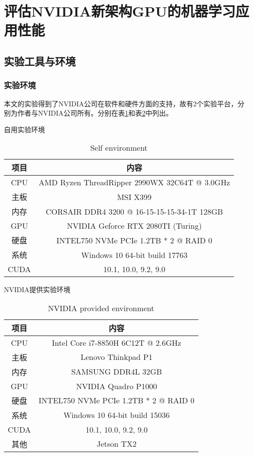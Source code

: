 \newpage
\section{评估NVIDIA新架构GPU的机器学习应用性能}
\setcounter{table}{0}
\setcounter{figure}{0}
\subsection{实验工具与环境}
\subsubsection{实验环境}
\par 本文的实验得到了NVIDIA公司在软件和硬件方面的支持，故有2个实验平台，分别为作者与NVIDIA公司所有。分别在表\ref{table-自用环境}和表\ref{table-公司环境}中列出。\\
\begin{table}
	\centering
	\renewcommand{\thetable}{\arabic{section}-\arabic{table} }
	\renewcommand{\tablename}{表}
	\caption{自用实验环境}
	\addtocounter{table}{-1}
	\renewcommand{\thetable}{\arabic{section}-\arabic{table} }
	\renewcommand{\tablename}{Table}
	\caption{Self environment}
	\begin{tabular}{cc}
		\toprule
		项目	&	内容\\
		\midrule
		CPU		&	AMD Ryzen ThreadRipper 2990WX 32C64T @ 3.0GHz\\
		主板		&	MSI X399\\
		内存		&	CORSAIR DDR4 3200 @ 16-15-15-15-34-1T 128GB\\
		GPU		&	NVIDIA Geforce RTX 2080TI (Turing)\\
		硬盘		&	INTEL750 NVMe PCIe 1.2TB * 2 @ RAID 0\\
		系统		&	Windows 10 64-bit build 17763\\	
		CUDA	&	10.1, 10.0, 9.2, 9.0\\
		\bottomrule
	\end{tabular} 
	\label{table-自用环境}
\end{table}
\begin{table}
	\centering
	\renewcommand{\thetable}{\arabic{section}-\arabic{table} }
	\renewcommand{\tablename}{表}
	\caption{NVIDIA提供实验环境}
	\addtocounter{table}{-1}
	\renewcommand{\thetable}{\arabic{section}-\arabic{table} }
	\renewcommand{\tablename}{Table}
	\caption{NVIDIA provided environment}
	\begin{tabular}{cc}
		\toprule
		项目	&	内容\\
		\midrule
		CPU		&	Intel Core i7-8850H 6C12T @ 2.6GHz\\
		主板		&	Lenovo Thinkpad P1\\
		内存		&	SAMSUNG DDR4L 32GB\\
		GPU		&	NVIDIA Quadro P1000\\
		硬盘		&	INTEL750 NVMe PCIe 1.2TB * 2 @ RAID 0\\
		系统		&	Windows 10 64-bit build 15036\\	
		CUDA	&	10.1, 10.0, 9.2, 9.0\\
		其他		&	Jetson TX2\\
		\bottomrule
	\end{tabular} \label{table-公司环境} 
\end{table}
